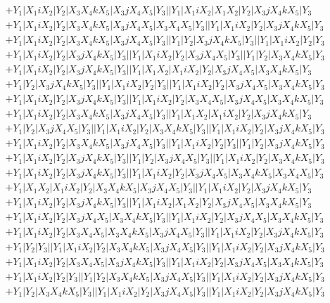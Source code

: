 \documentclass{article}[12pt]
\begin{document}
 
\begin{align*}
 & +Y_1|X_1iX_2|Y_2|X_3X_4kX_5|X_3jX_4X_5|Y_3||Y_1|X_1iX_2|X_1X_2|Y_2|X_3jX_4kX_5|Y_3\\ 
 & +Y_1|X_1iX_2|Y_2|X_3X_4kX_5|X_3jX_4X_5|X_3X_4X_5|Y_3||Y_1|X_1iX_2|Y_2|X_3jX_4kX_5|Y_3\\ 
 & +Y_1|X_1iX_2|Y_2|X_3X_4kX_5|X_3jX_4X_5|Y_3||Y_1|Y_2|X_3jX_4kX_5|Y_3||Y_1|X_1iX_2|Y_2|Y_3\\ 
 & +Y_1|X_1iX_2|Y_2|X_3jX_4kX_5|Y_3||Y_1|X_1iX_2|Y_2|X_3jX_4X_5|Y_3||Y_1|Y_2|X_3X_4kX_5|Y_3\\ 
 & +Y_1|X_1iX_2|Y_2|X_3jX_4kX_5|Y_3||Y_1|X_1X_2|X_1iX_2|Y_2|X_3jX_4X_5|X_3X_4kX_5|Y_3\\ 
 & +Y_1|Y_2|X_3jX_4kX_5|Y_3||Y_1|X_1iX_2|Y_2|Y_3||Y_1|X_1iX_2|Y_2|X_3jX_4X_5|X_3X_4kX_5|Y_3\\
 & +Y_1|X_1iX_2|Y_2|X_3jX_4kX_5|Y_3||Y_1|X_1iX_2|Y_2|X_3X_4X_5|X_3jX_4X_5|X_3X_4kX_5|Y_3\\ 
 & +Y_1|X_1iX_2|Y_2|X_3X_4kX_5|X_3jX_4X_5|Y_3||Y_1|X_1X_2|X_1iX_2|Y_2|X_3jX_4kX_5|Y_3\\ 
 & +Y_1|Y_2|X_3jX_4X_5|Y_3||Y_1|X_1iX_2|Y_2|X_3X_4kX_5|Y_3||Y_1|X_1iX_2|Y_2|X_3jX_4kX_5|Y_3\\ 
 & +Y_1|X_1iX_2|Y_2|X_3X_4kX_5|X_3jX_4X_5|Y_3||Y_1|X_1iX_2|Y_2|Y_3||Y_1|Y_2|X_3jX_4kX_5|Y_3\\ 
 & +Y_1|X_1iX_2|Y_2|X_3jX_4kX_5|Y_3||Y_1|Y_2|X_3jX_4X_5|Y_3||Y_1|X_1iX_2|Y_2|X_3X_4kX_5|Y_3\\ 
 & +Y_1|X_1iX_2|Y_2|X_3jX_4kX_5|Y_3||Y_1|X_1iX_2|Y_2|X_3jX_4X_5|X_3X_4kX_5|X_3X_4X_5|Y_3\\ 
 & +Y_1|X_1X_2|X_1iX_2|Y_2|X_3X_4kX_5|X_3jX_4X_5|Y_3||Y_1|X_1iX_2|Y_2|X_3jX_4kX_5|Y_3\\ 
 & +Y_1|X_1iX_2|Y_2|X_3jX_4kX_5|Y_3||Y_1|X_1iX_2|X_1X_2|Y_2|X_3jX_4X_5|X_3X_4kX_5|Y_3\\ 
 & +Y_1|X_1iX_2|Y_2|X_3jX_4X_5|X_3X_4kX_5|Y_3||Y_1|X_1iX_2|Y_2|X_3jX_4X_5|X_3X_4kX_5|Y_3\\ 
 & +Y_1|X_1iX_2|Y_2|X_3X_4X_5|X_3X_4kX_5|X_3jX_4X_5|Y_3||Y_1|X_1iX_2|Y_2|X_3jX_4kX_5|Y_3\\ 
 & +Y_1|Y_2|Y_3||Y_1|X_1iX_2|Y_2|X_3X_4kX_5|X_3jX_4X_5|Y_3||Y_1|X_1iX_2|Y_2|X_3jX_4kX_5|Y_3\\ 
 & +Y_1|X_1iX_2|Y_2|X_3X_4X_5|X_3jX_4kX_5|Y_3||Y_1|X_1iX_2|Y_2|X_3jX_4X_5|X_3X_4kX_5|Y_3\\ 
 & +Y_1|X_1iX_2|Y_2|Y_3||Y_1|Y_2|X_3X_4kX_5|X_3jX_4X_5|Y_3||Y_1|X_1iX_2|Y_2|X_3jX_4kX_5|Y_3\\ 
 & +Y_1|Y_2|X_3X_4kX_5|Y_3||Y_1|X_1iX_2|Y_2|X_3jX_4X_5|Y_3||Y_1|X_1iX_2|Y_2|X_3jX_4kX_5|Y_3\\  

\end{align*}
\end{document}
